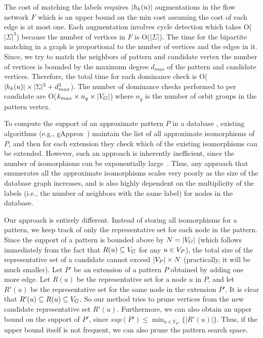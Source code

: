  The cost of matching the \khop labels
requires $|h_{k}(u)|$ augmentations in the flow network $F$ which is an
upper bound on the min cost assuming the cost of each edge is at most one. Each
augmentation involves cycle detection which takes O($|\Sigma|^3$) because the
number of vertices in $F$ is O($|\Sigma|$).  The time for the bipartite matching
in a graph is proportional to the number of vertices and the edges in it.
Since, we try to match the neighbors of pattern and candidate vertex the number
of vertices is bounded by the maximum degree $d_{max}$ of the pattern and
candidate vertices. Therefore, the total time for each dominance check is
O($|h_{k}(u)| \times |\Sigma|^3 + d_{max}^{3}$).  The number of dominance
checks performed to per candidate are O($k_{max} \times n_g \times |V_G|$) where
$n_g$ is the number of orbit groups in the pattern vertex. 

To compute the support of an approximate pattern $P$ in a database \db,
existing algorithms (e.g., gApprox~\cite{gapprox}) maintain the list of
all approximate isomorphisms of $P$, and then for each extension they
check which of the existing isomorphisms can be extended. However, such an
approach is inherently inefficient, since the number of isomorphisms can
be exponentially large~\cite{2011-icdm}.  Thus, any approach that
enumerates all the approximate isomorphisms scales very poorly as the size
of the database graph increases, and is also highly dependent on the
multiplicity of the labels (i.e., the number of neighbors with the same
label) for nodes in the database.

Our approach is entirely different. Instead of storing all isomorphisms
for a pattern, we keep track of only the representative set for each
node in the pattern.  Since the support of a pattern is bounded above by
$N=|V_G|$ (which follows immediately from the fact that $R(u) \subseteq
V_G$ for any $u \in V_P$), the total size of the representative set of a
candidate cannot exceed $|V_P| \times N$ (practically, it will be much
smaller).  Let $P'$ be an extension of a pattern $P$ obtained by adding
one more edge. Let $R(u)$ be the representative set for a node $u$ in
$P$, and let $R'(u)$ be the representative set for the same node in the
extension $P'$. It is clear that $R'(u) \subseteq R(u) \subseteq V_G$.
So our method tries to prune vertices from the new candidate
representative set $R'(u)$. 
Furthermore, we can also obtain an upper
bound on the support of $P'$, since $sup(P') \le \min_{u \in V_{P'}}
\{|R'(u)|\}$. Thus, if the upper bound itself is not frequent, we can
also prune the pattern search space.
\fi
